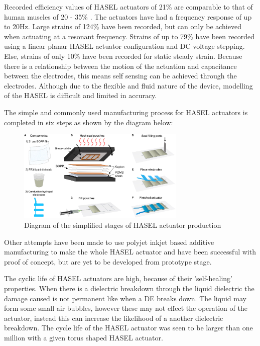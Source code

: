 Recorded efficiency values of HASEL actuators of 21\% are comparable to that of human muscles of 20 - 35\% \citep{Smith2005}. The actuators have had a frequency response of up to 20Hz. Large strains of 124\% have been recorded, but can only be achieved when actuating at a resonant frequency. Strains of up to 79\% have been recorded using a linear planar HASEL actuator configuration and DC voltage stepping.  Else, strains of only 10\% have been recorded for static steady strain\citep{Kellaris2018}.
Because there is a relationship between the motion of the actuation and capacitance between the electrodes, this means self sensing can be achieved through the electrodes. Although due to the flexible and fluid nature of the device, modelling of the HASEL is difficult and limited in accuracy.

The simple and commonly used manufacturing process for HASEL actuators is completed in six steps as shown by the diagram below:
\begin{figure}[h!]
  \centering
  \includegraphics[width=8cm]{Figures/HASEL_manuf.jpg}
  \caption{Diagram of the simplified stages of HASEL actuator production\citep{Kellaris2018}}
  \label{fig:Artificial Muscle}
\end{figure}

Other attempts have been made to use polyjet inkjet based additive manufacturing to make the whole HASEL actuator and have been successful with proof of concept, but are yet to be developed from prototype stage\citep{Manionn.d.}. 

The cyclic life of HASEL actuators are high, because of their 'self-healing' properties. When there is a dielectric breakdown through the liquid dielectric the damage caused is not permanent like when a DE breaks down. The liquid may form some small air bubbles, however these may not effect the operation of the actuator, instead this can increase the likelihood of a another dielectric breakdown. The cycle life of the HASEL actuator was seen to be larger than one million with a given torus shaped HASEL actuator\citep{Acome2018}.

